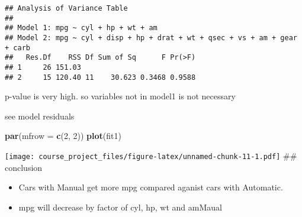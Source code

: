 \documentclass[
]{article}
\newenvironment{Shaded}{\begin{snugshade}}{\end{snugshade}}
\newcommand{\DataTypeTok}[1]{\textcolor[rgb]{0.13,0.29,0.53}{#1}}
\newcommand{\DecValTok}[1]{\textcolor[rgb]{0.00,0.00,0.81}{#1}}
\newcommand{\KeywordTok}[1]{\textcolor[rgb]{0.13,0.29,0.53}{\textbf{#1}}}
\newcommand{\NormalTok}[1]{#1}
\providecommand{\tightlist}{%
  \setlength{\itemsep}{0pt}\setlength{\parskip}{0pt}}
\begin{document}
\begin{verbatim}
## Analysis of Variance Table
## 
## Model 1: mpg ~ cyl + hp + wt + am
## Model 2: mpg ~ cyl + disp + hp + drat + wt + qsec + vs + am + gear + carb
##   Res.Df    RSS Df Sum of Sq      F Pr(>F)
## 1     26 151.03                           
## 2     15 120.40 11    30.623 0.3468 0.9588
\end{verbatim}

p-value is very high. so variables not in model1 is not necessary

see model residuals

\begin{Shaded}
\begin{Highlighting}[]
\KeywordTok{par}\NormalTok{(}\DataTypeTok{mfrow =} \KeywordTok{c}\NormalTok{(}\DecValTok{2}\NormalTok{, }\DecValTok{2}\NormalTok{))}
\KeywordTok{plot}\NormalTok{(fit1)}
\end{Highlighting}
\end{Shaded}

\texttt{[image: course\_project\_files/figure-latex/unnamed-chunk-11-1.pdf]}
\#\# conclusion

\begin{itemize}
\tightlist
\item
  Cars with Manual get more mpg compared aganist cars with Automatic.
\item
  mpg will decrease by factor of cyl, hp, wt and amMaual
\end{itemize}
\end{document}
